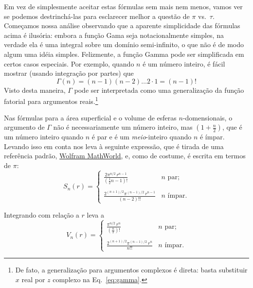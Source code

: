 Em vez de simplesmente aceitar estas fórmulas sem mais nem menos, vamos ver se podemos destrinchá-las para esclarecer melhor a questão de $\pi$ vs.~$\tau$. Começamos nossa análise observando que a aparente simplicidade das fórmulas acima é ilusória: embora a função Gama seja notacionalmente simples, na verdade ela é uma integral sobre um domínio semi-infinito, o que não é de modo algum uma idéia simples. Felizmente, a função Gamma pode ser simplificada em certos casos especiais. Por exemplo, quando $n$ é um número inteiro, é fácil mostrar (usando integração por partes) que
\[
\Gamma(n) = (n-1)(n-2)\ldots 2\cdot 1 = (n-1)!
\]
Visto desta maneira, $\Gamma$ pode ser interpretada como uma generalização da função fatorial para argumentos reais.\footnote{De fato, a generalização para argumentos complexos é direta: basta substituir $x$ real por $z$ complexo na Eq.~\eqref{eq:gamma}.} 

Nas fórmulas para a área superficial e o volume de esferas $n$-domensionais, o argumento de $\Gamma$ não é necessariamente um número inteiro, mas $\left(1 + \frac{n}{2}\right)$, que é um número inteiro quando $n$ é par e é um \emph{meio}-inteiro quando $n$ é ímpar. Levando isso em conta nos leva à seguinte expressão, que é tirada de uma referência padrão, \href{https://mathworld.wolfram.com/Hypersphere.html}{Wolfram MathWorld}, e, como de costume, é escrita em termos de $\pi$:
\begin{equation}
\label{eq:surface_area_mathworld}
S_n(r) = \begin{cases}
\displaystyle \frac{2\pi^{n/2}\,r^{n-1}}{(\frac{1}{2}n - 1)!} & n \text{ par}; \\ \\
 \displaystyle \frac{2^{(n+1)/2}\pi^{(n-1)/2}\,r^{n-1}}{(n-2)!!} & n \text{ ímpar}.
\end{cases}
\end{equation}

Integrando com relação a $r$ leva a
\begin{equation}
\label{eq:volume_mathworld}
V_n(r) = \begin{cases}
\displaystyle \frac{\pi^{n/2}\,r^n}{(\frac{n}{2})!} & n \text{ par}; \\ \\
\displaystyle \frac{2^{(n+1)/2}\pi^{(n-1)/2}\,r^n}{n!!} & n \text{ ímpar}.
\end{cases}
\end{equation}

